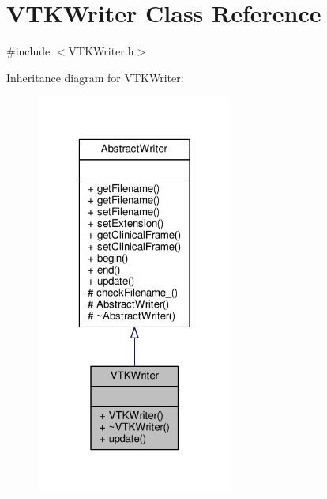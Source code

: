 \hypertarget{classVTKWriter}{\section{V\-T\-K\-Writer Class Reference}
\label{classVTKWriter}
}


{\ttfamily \#include $<$V\-T\-K\-Writer.\-h$>$}



Inheritance diagram for V\-T\-K\-Writer\-:
\nopagebreak
\begin{figure}[H]
\begin{center}
\leavevmode
\includegraphics[width=184pt]{classVTKWriter__inherit__graph}
\end{center}
\end{figure}


